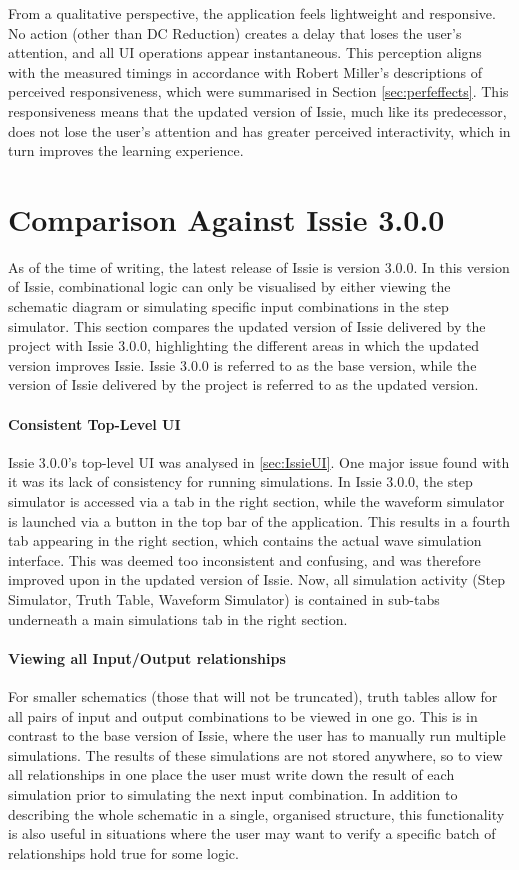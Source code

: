 From a qualitative perspective, the application feels lightweight and responsive. No action (other than DC Reduction) creates a delay that loses the user's attention, and all UI operations appear instantaneous. This perception aligns with the measured timings in accordance with Robert Miller's descriptions of perceived responsiveness, which were summarised in Section \ref{sec:perfeffects}. This responsiveness means that the updated version of Issie, much like its predecessor, does not lose the user's attention and has greater perceived interactivity, which in turn improves the learning experience.

\section{Comparison Against Issie 3.0.0}
As of the time of writing, the latest release of Issie is version 3.0.0. In this version of Issie, combinational logic can only be visualised by either viewing the schematic diagram or simulating specific input combinations in the step simulator. This section compares the updated version of Issie delivered by the project with Issie 3.0.0, highlighting the different areas in which the updated version improves Issie. Issie 3.0.0 is referred to as the base version, while the version of Issie delivered by the project is referred to as the updated version.

\paragraph{Consistent Top-Level UI} Issie 3.0.0's top-level UI was analysed in \ref{sec:IssieUI}. One major issue found with it was its lack of consistency for running simulations. In Issie 3.0.0, the step simulator is accessed via a tab in the right section, while the waveform simulator is launched via a button in the top bar of the application. This results in a fourth tab appearing in the right section, which contains the actual wave simulation interface. This was deemed too inconsistent and confusing, and was therefore improved upon in the updated version of Issie. Now, all simulation activity (Step Simulator, Truth Table, Waveform Simulator) is contained in sub-tabs underneath a main simulations tab in the right section.

\paragraph{Viewing all Input/Output relationships} For smaller schematics (those that will not be truncated), truth tables allow for all pairs of input and output combinations to be viewed in one go. This is in contrast to the base version of Issie, where the user has to manually run multiple simulations. The results of these simulations are not stored anywhere, so to view all relationships in one place the user must write down the result of each simulation prior to simulating the next input combination. In addition to describing the whole schematic in a single, organised structure, this functionality is also useful in situations where the user may want to verify a specific batch of relationships hold true for some logic.

